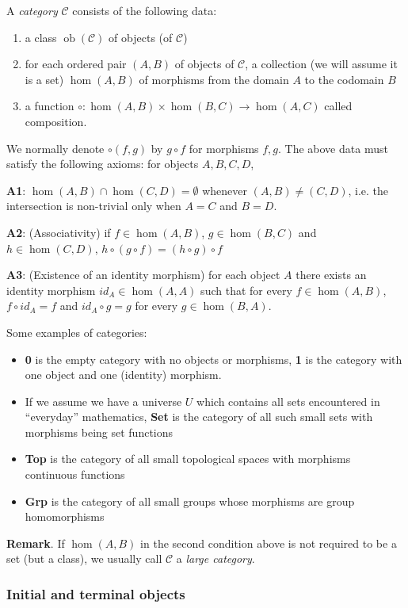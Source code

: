 A \emph{category} $\mathcal{C}$ consists of the following data:
\begin{enumerate}
\item a class $\operatorname{ob}(\mathcal{C})$ of objects (of $\mathcal{C}$)
\item for each ordered pair $(A,B)$ of objects of $\mathcal{C}$, a collection (we will assume it is
 a set) $\hom(A,B)$ of morphisms from the domain $A$ to the codomain $B$
\item a function $\circ:\hom(A,B)\times\hom(B,C)\to\hom(A,C)$ called composition.
\end{enumerate}

We normally denote $\circ(f,g)$ by $g \circ f$ for morphisms $f,g$. The above data must satisfy the following axioms: for objects $A,B,C,D$,

\textbf{A1}: $\hom(A,B) \cap \hom(C,D)=\emptyset$ whenever $(A,B)\neq (C,D)$, i.e. the intersection is non-trivial only when $A=C$ and $B=D$.

\textbf{A2}: (Associativity) if $f \in \hom(A,B)$, $g\in\hom(B,C)$ and $h\in\hom(C,D)$, $h\circ (g\circ f)=(h\circ g)\circ f$

\textbf{A3}: (Existence of an identity morphism) for each object $A$ there exists an identity morphism $ {}id_{A}\in\hom(A,A)$ such that for every $f\in\hom(A,B)$, $f\circ id_{A}=f$ and $ {}id_{A}\circ g=g$ for every $g \in \hom(B,A)$.

Some examples of categories:
\begin{itemize}
\item \textbf{0} is the empty category with no objects or morphisms, \textbf{1} is the category with one object and one (identity) morphism.
\item If we assume we have a universe $U$ which contains all sets encountered in ``everyday'' mathematics,
\textbf{Set} is the category of all such small sets with morphisms being set functions
\item \textbf{Top} is the category of all small topological spaces with morphisms continuous functions
\item \textbf{Grp} is the category of all small groups whose morphisms are group homomorphisms
\end{itemize}

\textbf{Remark}.  If $\hom(A,B)$ in the second condition above is not required to be a set (but a class), we usually call $\mathcal{C}$ a \emph{large category}.

\subsubsection{Initial and terminal objects}


